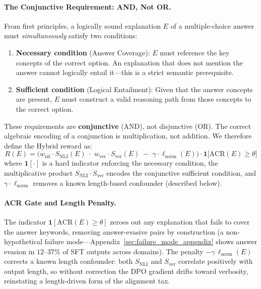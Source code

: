 \paragraph{The Conjunctive Requirement: AND, Not OR.}
From first principles, a logically sound explanation $E$ of a multiple-choice answer must \emph{simultaneously} satisfy two conditions:
\begin{enumerate}
    \item \textbf{Necessary condition} (Answer Coverage): $E$ must reference the key concepts of the correct option.
    An explanation that does not mention the answer cannot logically entail it---this is a strict semantic prerequisite.
    \item \textbf{Sufficient condition} (Logical Entailment): Given that the answer concepts are present, $E$ must construct a valid reasoning path from those concepts to the correct option.
\end{enumerate}
These requirements are \textbf{conjunctive} (AND), not disjunctive (OR). The correct algebraic encoding of a conjunction is multiplication, not addition. We therefore define the Hybrid reward as:
\begin{equation}
R(E) = \bigl(w_\text{nli}\cdot S_\text{NLI}(E)\;\cdot\; w_\text{ver}\cdot S_\text{ver}(E)\;-\;\gamma\cdot\ell_\text{norm}(E)\bigr)\cdot\mathbf{1}\bigl[\mathrm{ACR}(E)\geq\theta\bigr]
\label{eq:hybrid_reward}
\end{equation}
where $\mathbf{1}[\cdot]$ is a hard indicator enforcing the necessary condition, the multiplicative product $S_\text{NLI}\cdot S_\text{ver}$ encodes the conjunctive sufficient condition, and $\gamma\cdot\ell_\text{norm}$ removes a known length-based confounder (described below).

\paragraph{ACR Gate and Length Penalty.}
\label{sec:length_norm}
The indicator $\mathbf{1}[\mathrm{ACR}(E){\geq}\theta]$ zeroes out any explanation that fails to cover the answer keywords, removing answer-evasive pairs by construction (a non-hypothetical failure mode---Appendix~\ref{sec:failure_mode_appendix} shows answer evasion in $12$--$37\%$ of SFT outputs across domains). The penalty $-\gamma\,\ell_\text{norm}(E)$ corrects a known length confounder: both $S_\text{NLI}$ and $S_\text{ver}$ correlate positively with output length, so without correction the DPO gradient drifts toward verbosity, reinstating a length-driven form of the alignment tax.

